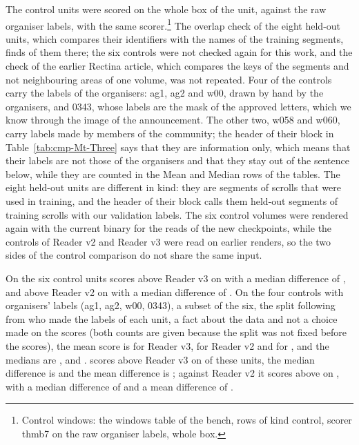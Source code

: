 The control units were scored on the whole box of the unit, against the raw organiser labels, with the same
scorer.\footnote{Control windows: the windows table of the bench, rows of kind control, scorer
thmb7 on the raw organiser labels, whole box.} The overlap check of the eight held-out units, which compares their identifiers with the names of the \TrainSegN{} training segments, finds \OverlapHeld{} of them there; the six controls were not checked again for this work, and the check of the earlier Rectina article, which compares the keys of the segments and not neighbouring areas of one volume, was not repeated. Four of the controls carry the
labels of the organisers: ag1, ag2 and w00, drawn by hand by the organisers, and 0343, whose labels are the mask of the
approved letters, which we know through the image of the announcement. The other two, w058 and w060, carry
labels made by members of the community; the header of their block in Table~\ref{tab:cmp-Mt-Three} says that they are
information only, which means that their labels are not those of the organisers and that they stay out of the
sentence below, while they are counted in the Mean and Median rows of the tables. The eight held-out units are
different in kind: they are segments of scrolls that were used in training, and the header of their block calls them
held-out segments of training scrolls with our validation labels. The six control volumes were rendered again with the current binary for the reads of the new checkpoints, while the controls of Reader v2 and Reader v3 were read on earlier renders, so the two sides of the control comparison do not share the same input.

On the six control units \MtName{} scores above Reader v3 on \MtCtrlKTextThree{} with a median difference of \MtCtrlMedianDiffThreeAuc{}, and above Reader v2 on \MtCtrlKTextTwo{} with a median difference of \MtCtrlMedianDiffTwoAuc{}. On the four controls with organisers' labels (ag1, ag2, w00, 0343), a subset of the six, the split following from who made the labels of each unit, a fact about the data and not a choice made on the scores (both counts are given because the split was not fixed before the scores), the mean score is \MtOrgMeanRThreeAuc{} for Reader v3, \MtOrgMeanRTwoAuc{} for Reader v2 and \MtOrgMeanOwnAuc{} for
\MtName{}, and the medians are \MtOrgMedianRThreeAuc{}, \MtOrgMedianRTwoAuc{} and \MtOrgMedianOwnAuc{}. \MtName{} scores above Reader v3 on
\MtOrgKTextThree{} of these units, the median difference is \MtOrgMedianDiffThreeAuc{} and the mean difference is
\MtOrgMeanDiffThreeAuc{}; against Reader v2 it scores above on \MtOrgKTextTwo{}, with a median difference of \MtOrgMedianDiffTwoAuc{} and a mean difference of \MtOrgMeanDiffTwoAuc{}.


